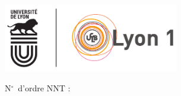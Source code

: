 
\thispagestyle{empty}
\begin{center}
\large

\includegraphics[height=3cm]{./FrontBackMatter/Planche_UdL_LogoLyon1Sig_CoulCmjnVecto-eps-converted-to.pdf}

\begin{flushleft}
N$^\circ$\ d'ordre NNT :
\end{flushleft}
\vspace{\baselineskip}



\vfill

\end{center}
